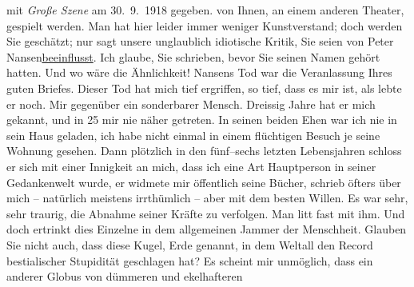 \begin{ledgroupsized}[t]{13cm}
{{{                        mit \emph{Große Szene} am
                            30. 9. 1918 gegeben.}}}\label{K_L02303_2h} von Ihnen, an einem anderen
                    Theater, gespielt werden. Man hat hier leider immer weniger Kunstverstand; doch
                    werden Sie geschätzt; nur sagt unsere unglaublich idiotische Kritik, Sie seien
                    von Peter Nansen\uline{beeinflusst}. Ich glaube, Sie schrieben, bevor
                    Sie seinen Namen gehört hatten. Und wo wäre die Ähnlichkeit!\pend
           \pstart
           Nansens Tod war die Veranlassung Ihres guten
                    Briefes. Dieser Tod hat mich tief ergriffen, so tief, dass es mir ist, als lebte
                    er noch. Mir gegenüber ein sonderbarer Mensch. Dreissig Jahre hat er mich
                    gekannt, und \introOben{}in 25\introOben{} mir nie näher getreten. In seinen
                    beiden Ehen war ich nie in sein Haus geladen, ich habe nicht einmal in einem
                    flüchtigen Besuch je seine Wohnung {\pb}gesehen. Dann plötzlich in
                    den fünf–sechs letzten Lebensjahren schloss er sich mit einer Innigkeit an mich,
                    dass ich eine Art Hauptperson in seiner Gedankenwelt wurde, er widmete mir
                    öffentlich seine Bücher,
                    schrieb öfters über mich – natürlich meistens irrthümlich – aber mit dem besten
                    Willen.\pend
           \pstart
           Es war sehr, sehr traurig, die Abnahme seiner Kräfte zu verfolgen. Man litt fast
                    mit ihm.\pend
           \pstart
           Und doch ertrinkt dies Einzelne in dem allgemeinen Jammer der Menschheit. Glauben
                    Sie nicht  auch, dass diese Kugel, Erde
                    genannt, in dem Weltall den Record bestialischer Stupidität geschlagen hat? Es
                    scheint mir unmöglich, dass ein anderer Globus von dümmeren und ekelhafteren

\end{ledgroupsized}
